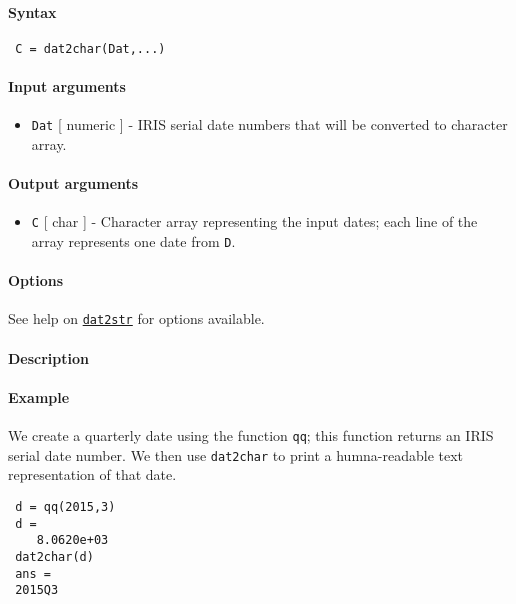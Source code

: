 


	\paragraph{Syntax}
 
 \begin{verbatim}
 C = dat2char(Dat,...)
 \end{verbatim}
 
 \paragraph{Input arguments}
 
 \begin{itemize}
 \item
   \texttt{Dat} {[} numeric {]} - IRIS serial date numbers that will be
   converted to character array.
 \end{itemize}
 
 \paragraph{Output arguments}
 
 \begin{itemize}
 \item
   \texttt{C} {[} char {]} - Character array representing the input
   dates; each line of the array represents one date from \texttt{D}.
 \end{itemize}
 
 \paragraph{Options}
 
 See help on \href{dates/dat2str}{\texttt{dat2str}} for options
 available.
 
 \paragraph{Description}
 
 \paragraph{Example}
 
 We create a quarterly date using the function \texttt{qq}; this function
 returns an IRIS serial date number. We then use \texttt{dat2char} to
 print a humna-readable text representation of that date.
 
 \begin{verbatim}
 d = qq(2015,3)
 d =
    8.0620e+03
 dat2char(d)
 ans =
 2015Q3
 \end{verbatim}


